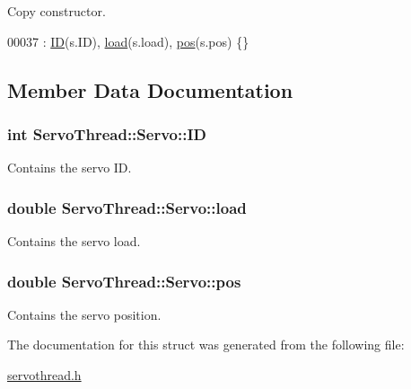 Copy constructor. 


\begin{DoxyCode}
00037 : \hyperlink{struct_servo_thread_1_1_servo_a06b514c42113aa85fd1703fc88fca7ce}{ID}(s.ID), \hyperlink{struct_servo_thread_1_1_servo_ae378d77acf16b306649c87fdb8df677e}{load}(s.load), \hyperlink{struct_servo_thread_1_1_servo_a9fa0aa56944b9b0bb9d66303d5bd4b59}{pos}(s.pos) \{\}
\end{DoxyCode}


\subsection{Member Data Documentation}
\hypertarget{struct_servo_thread_1_1_servo_a06b514c42113aa85fd1703fc88fca7ce}{}
\subsubsection[{I\+D}]{\setlength{\rightskip}{0pt plus 5cm}int Servo\+Thread\+::\+Servo\+::\+I\+D}\label{struct_servo_thread_1_1_servo_a06b514c42113aa85fd1703fc88fca7ce}


Contains the servo I\+D. 

\hypertarget{struct_servo_thread_1_1_servo_ae378d77acf16b306649c87fdb8df677e}{}
\subsubsection[{load}]{\setlength{\rightskip}{0pt plus 5cm}double Servo\+Thread\+::\+Servo\+::load}\label{struct_servo_thread_1_1_servo_ae378d77acf16b306649c87fdb8df677e}


Contains the servo load. 

\hypertarget{struct_servo_thread_1_1_servo_a9fa0aa56944b9b0bb9d66303d5bd4b59}{}
\subsubsection[{pos}]{\setlength{\rightskip}{0pt plus 5cm}double Servo\+Thread\+::\+Servo\+::pos}\label{struct_servo_thread_1_1_servo_a9fa0aa56944b9b0bb9d66303d5bd4b59}


Contains the servo position. 



The documentation for this struct was generated from the following file\+:\begin{DoxyCompactItemize}
\item 
\hyperlink{servothread_8h}{servothread.\+h}\end{DoxyCompactItemize}

